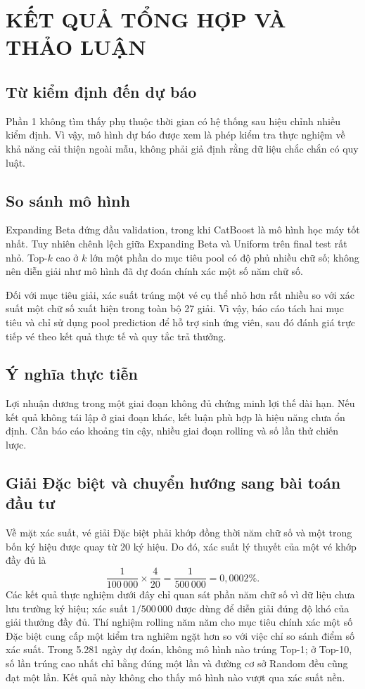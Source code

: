 \chapter{KẾT QUẢ TỔNG HỢP VÀ THẢO LUẬN}
\section{Từ kiểm định đến dự báo}
Phần 1 không tìm thấy phụ thuộc thời gian có hệ thống sau hiệu chỉnh nhiều kiểm định. Vì vậy, mô hình dự báo được xem là phép kiểm tra thực nghiệm về khả năng cải thiện ngoài mẫu, không phải giả định rằng dữ liệu chắc chắn có quy luật.

\section{So sánh mô hình}
Expanding Beta đứng đầu validation, trong khi CatBoost là mô hình học máy tốt nhất. Tuy nhiên chênh lệch giữa Expanding Beta và Uniform trên final test rất nhỏ. Top-$k$ cao ở $k$ lớn một phần do mục tiêu pool có độ phủ nhiều chữ số; không nên diễn giải như mô hình đã dự đoán chính xác một số năm chữ số.

Đối với mục tiêu giải, xác suất trúng một vé cụ thể nhỏ hơn rất nhiều so với xác suất một chữ số xuất hiện trong toàn bộ 27 giải. Vì vậy, báo cáo tách hai mục tiêu và chỉ sử dụng pool prediction để hỗ trợ sinh ứng viên, sau đó đánh giá trực tiếp vé theo kết quả thực tế và quy tắc trả thưởng.

\section{Ý nghĩa thực tiễn}
Lợi nhuận dương trong một giai đoạn không đủ chứng minh lợi thế dài hạn. Nếu kết quả không tái lập ở giai đoạn khác, kết luận phù hợp là hiệu năng chưa ổn định. Cần báo cáo khoảng tin cậy, nhiều giai đoạn rolling và số lần thử chiến lược.

\section{Giải Đặc biệt và chuyển hướng sang bài toán đầu tư}
Về mặt xác suất, vé giải Đặc biệt phải khớp đồng thời năm chữ số và một trong bốn ký hiệu được quay từ 20 ký hiệu. Do đó, xác suất lý thuyết của một vé khớp đầy đủ là
\[
\frac{1}{100\,000}\times\frac{4}{20}=\frac{1}{500\,000}=0{,}0002\%.
\]
Các kết quả thực nghiệm dưới đây chỉ quan sát phần năm chữ số vì dữ liệu chưa lưu trường ký hiệu; xác suất $1/500\,000$ được dùng để diễn giải đúng độ khó của giải thưởng đầy đủ.
Thí nghiệm rolling năm năm cho mục tiêu chính xác một số Đặc biệt cung cấp một kiểm tra nghiêm ngặt hơn so với việc chỉ so sánh điểm số xác suất. Trong 5.281 ngày dự đoán, không mô hình nào trúng Top-1; ở Top-10, số lần trúng cao nhất chỉ bằng đúng một lần và đường cơ sở Random đều cũng đạt một lần. Kết quả này không cho thấy mô hình nào vượt qua xác suất nền.

